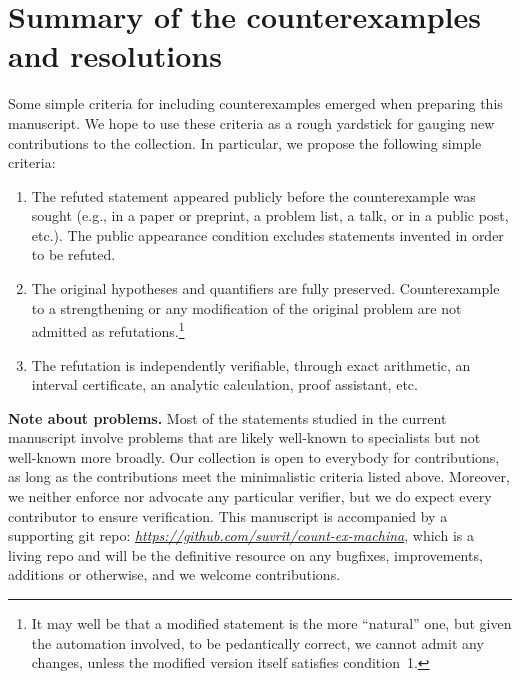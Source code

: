 \section{Summary of the counterexamples and resolutions}
Some simple criteria for including counterexamples emerged when preparing this manuscript. We hope to use these criteria as a rough yardstick for gauging new contributions to the collection. In particular, we propose the following simple criteria:
\begin{definition}[\textbf{\textcolor{darkblue}{Admission criteria}}]
\begin{enumerate}
\item The refuted statement appeared publicly before the counterexample was sought (e.g., in a paper or preprint, a problem list, a talk, or in a public post, etc.). The public appearance condition excludes statements invented in order to be refuted.
\item The original hypotheses and quantifiers are fully preserved.  Counterexample to a strengthening or any modification of the original problem are not admitted as refutations.\footnote{It may well be that a modified statement is the more ``natural'' one, but given the automation involved, to be pedantically correct, we cannot admit any changes, unless the modified version itself satisfies condition~1.}
\item The refutation is independently verifiable, through exact arithmetic, an interval certificate, an analytic calculation, proof assistant, etc.
\end{enumerate}
\end{definition}

\noindent\textbf{Note about problems.} Most of the statements studied in the current manuscript involve problems that are likely well-known to specialists but not well-known more broadly. Our collection is open to everybody for contributions, as long as the contributions meet the minimalistic criteria listed above. Moreover, we neither enforce nor advocate any particular verifier, but we do expect every contributor to ensure verification. This manuscript is accompanied by a supporting git repo: \href{https://github.com/suvrit/count-ex-machina}{\selectfont\itshape https://github.com/suvrit/count-ex-machina}, which is a living repo and will be the definitive resource on any bugfixes, improvements, additions or otherwise, and we welcome contributions. %

